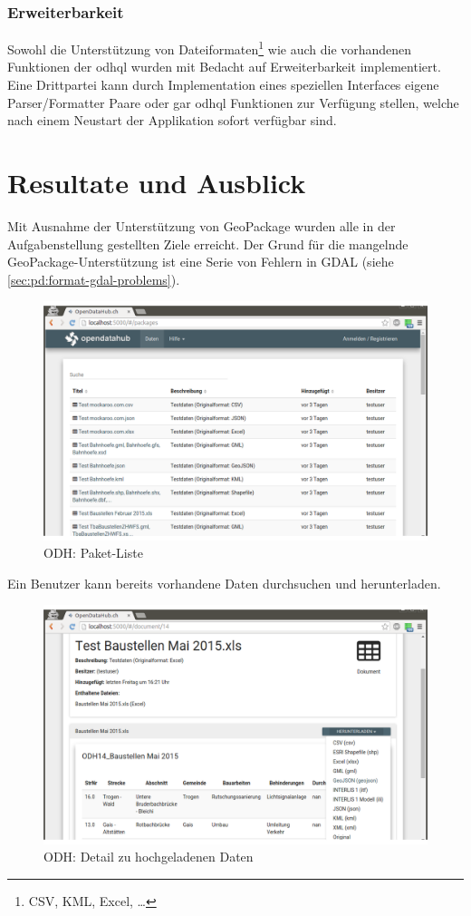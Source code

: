 \subsection{Erweiterbarkeit}
Sowohl die Unterstützung von Dateiformaten\footnote{CSV, KML, Excel, \dots} wie auch die vorhandenen Funktionen der \acf{odhql} wurden mit Bedacht auf Erweiterbarkeit implementiert. Eine Drittpartei kann durch Implementation eines speziellen Interfaces eigene Parser/Formatter Paare oder gar \gls{odhql} Funktionen zur Verfügung stellen, welche nach einem Neustart der Applikation sofort verfügbar sind.


\chapter{Resultate und Ausblick} \label{sec:tb:results}
Mit Ausnahme der Unterstützung von GeoPackage wurden alle in der Aufgabenstellung gestellten Ziele erreicht. Der Grund für die mangelnde GeoPackage-Unterstützung ist eine Serie von Fehlern in GDAL (siehe \cref{sec:pd:format-gdal-problems}).

\begin{figure}[H]
    \centering
    \includegraphics[width=2\linewidth/3]{fig/odh-package-list}
    \caption{ODH: Paket-Liste}
\end{figure}

Ein Benutzer kann bereits vorhandene Daten durchsuchen und herunterladen. 

\begin{figure}[H]
    \centering
    \includegraphics[width=2\linewidth/3]{fig/odh-document-detail}
    \caption{ODH: Detail zu hochgeladenen Daten}
\end{figure}


